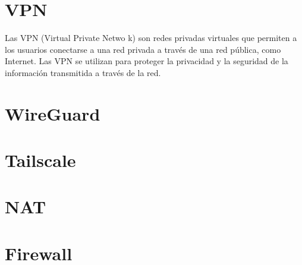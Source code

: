 
\section{VPN} %
Las VPN (Virtual Private Netwo  k) son redes privadas virtuales que permiten a los usuarios conectarse a una red privada a través de una red pública, como Internet. Las VPN se utilizan para proteger la privacidad y la seguridad de la información transmitida a través de la red.



\section{WireGuard}


\section{Tailscale}



\section{NAT}


\section{Firewall}